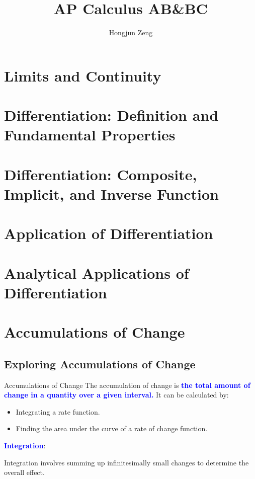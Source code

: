 \documentclass[12pt]{article}
\theoremstyle{beautifulthm}
\begin{document}
\title{AP Calculus AB\&BC}
\author{Hongjun Zeng}
\maketitle
\lipsum[1-10] 

\tableofcontents
\section{Limits and Continuity}
\section{Differentiation: Definition and Fundamental Properties}
\section{Differentiation: Composite, Implicit, and Inverse Function}
\section{Application of Differentiation}
\section{Analytical Applications of Differentiation}
\section{Accumulations of Change}
\newpage
\subsection{Exploring Accumulations
of Change}
\begin{Definition}{Accumulations of Change}
The accumulation of change is \textbf{\textcolor{blue}{the total amount of change in a quantity over a given interval.}} It can be calculated by:
\begin{itemize}
    \item Integrating a rate function.
    \item Finding the area under the curve of a rate of change function.
\end{itemize}

\textbf{\textcolor{blue}{Integration}}:

Integration involves summing up infinitesimally small changes to determine the overall effect.
    
\end{Definition}
\end{document}
